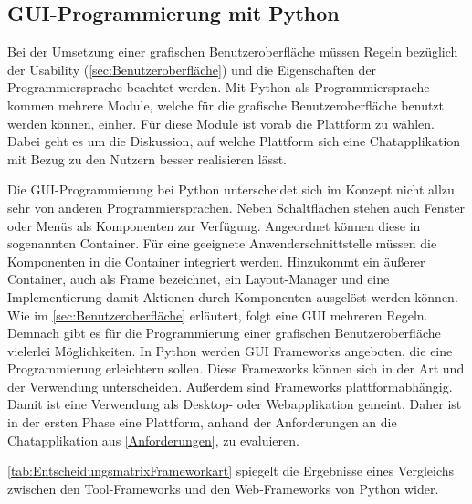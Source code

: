 \documentclass[a4paper,titlepage,halfparskip,12pt]{scrreprt}
\begin{document}
\begin{onehalfspacing}
\section{GUI-Programmierung mit Python}
\label{sec:GuiPython}

Bei der Umsetzung einer grafischen Benutzeroberfläche müssen Regeln bezüglich der Usability (\autoref{sec:Benutzeroberfläche}) und die Eigenschaften der Programmiersprache beachtet werden. Mit Python als Programmiersprache kommen mehrere Module, welche für die grafische Benutzeroberfläche benutzt werden können, einher. Für diese Module ist vorab die Plattform zu wählen. Dabei geht es um die Diskussion, auf welche Plattform sich eine Chatapplikation mit Bezug zu den Nutzern besser realisieren lässt.

Die \ac{GUI}-Programmierung bei Python unterscheidet sich im Konzept nicht allzu sehr von anderen Programmiersprachen. Neben Schaltflächen stehen auch Fenster oder Menüs als Komponenten zur Verfügung. Angeordnet können diese in sogenannten Container. Für eine geeignete Anwenderschnittstelle müssen die Komponenten in die Container integriert werden. Hinzukommt ein äußerer Container, auch als Frame bezeichnet, ein Layout-Manager und eine Implementierung damit Aktionen durch Komponenten ausgelöst werden können. Wie im \autoref{sec:Benutzeroberfläche} erläutert, folgt eine \ac{GUI} mehreren Regeln. Demnach gibt es für die Programmierung einer grafischen Benutzeroberfläche vielerlei Möglichkeiten. In Python werden \ac{GUI} Frameworks angeboten, die eine Programmierung erleichtern sollen. Diese Frameworks können sich in der Art und der Verwendung unterscheiden. Außerdem sind Frameworks plattformabhängig. Damit ist eine Verwendung als Desktop- oder Webapplikation gemeint. Daher ist in der ersten Phase eine Plattform, anhand der Anforderungen an die Chatapplikation aus \autoref{Anforderungen}, zu evaluieren.\cite{Steyer2018}

\pagebreak

\autoref{tab:EntscheidungsmatrixFrameworkart} spiegelt die Ergebnisse eines Vergleichs zwischen den Tool-Frameworks und den Web-Frameworks von Python wider.


\end{onehalfspacing}
\end{document}
